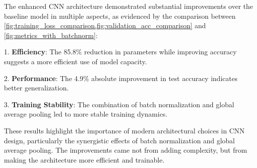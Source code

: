 The enhanced CNN architecture demonstrated substantial improvements over the baseline model in multiple aspects, as evidenced by the comparison between \cref{fig:training_loss_comparison,fig:validation_acc_comparison} and \cref{fig:metrics_with_batchnorm}:

1. \textbf{Efficiency}: The 85.8\% reduction in parameters while improving accuracy suggests a more efficient use of model capacity.

2. \textbf{Performance}: The 4.9\% absolute improvement in test accuracy indicates better generalization.

3. \textbf{Training Stability}: The combination of batch normalization and global average pooling led to more stable training dynamics.

These results highlight the importance of modern architectural choices in CNN design, particularly the synergistic effects of batch normalization and global average pooling. The improvements came not from adding complexity, but from making the architecture more efficient and trainable.